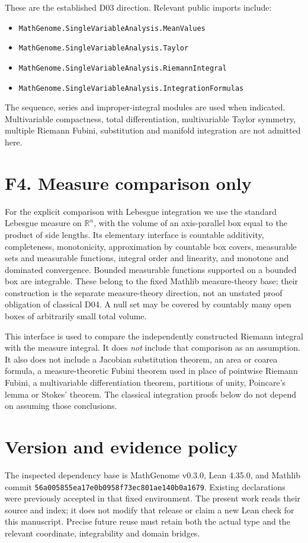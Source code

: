 \documentclass[11pt,oneside,openany]{book}
\theoremstyle{definition}
\theoremstyle{remark}
\newcounter{foundation}
\newcommand{\R}{\mathbb R}
\begin{document}
These are the established D03 direction. Relevant public imports include:
\begin{itemize}[leftmargin=*,itemsep=0pt]
\item \nolinkurl{MathGenome.SingleVariableAnalysis.MeanValues}
\item \nolinkurl{MathGenome.SingleVariableAnalysis.Taylor}
\item \nolinkurl{MathGenome.SingleVariableAnalysis.RiemannIntegral}
\item \nolinkurl{MathGenome.SingleVariableAnalysis.IntegrationFormulas}
\end{itemize}
The sequence, series and improper-integral modules are used when indicated. Multivariable
compactness, total differentiation, multivariable Taylor symmetry, multiple
Riemann Fubini, substitution and manifold integration are not admitted here.

\section*{F4. Measure comparison only}\label{base:measure}
For the explicit comparison with Lebesgue integration we use the standard
Lebesgue measure on $\R^n$, with the volume of an axis-parallel box equal to the
product of side lengths. Its elementary interface is countable additivity,
completeness, monotonicity, approximation by countable box covers, measurable
sets and measurable functions, integral order and linearity, and monotone and
dominated convergence. Bounded measurable functions supported on a bounded
box are integrable. These belong to the fixed Mathlib measure-theory base;
their construction is the separate measure-theory direction, not an unstated
proof obligation of classical D04. A null set may be covered by countably many
open boxes of arbitrarily small total volume.

This interface is used to compare the independently constructed Riemann
integral with the measure integral. It does \emph{not} include that comparison
as an assumption. It also does not include a Jacobian substitution theorem,
an area or coarea formula, a measure-theoretic Fubini theorem used in place of
pointwise Riemann Fubini, a multivariable differentiation theorem, partitions
of unity, Poincare's lemma or Stokes' theorem. The classical integration proofs
below do not depend on assuming those conclusions.

\section*{Version and evidence policy}
The inspected dependency base is MathGenome v0.3.0, Lean 4.35.0, and Mathlib
commit \texttt{56a005855ea17e0b0958f73ec801ae140b0a1679}. Existing declarations
were previously accepted in that fixed environment. The present work reads
their source and index; it does not modify that release or claim a new Lean
check for this manuscript. Precise future reuse must retain both the actual
type and the relevant coordinate, integrability and domain bridges.
\end{document}
